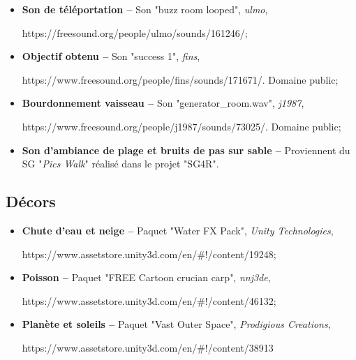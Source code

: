\begin{itemize}
		\item \textbf{Son de téléportation --} Son "buzz room looped", \textit{ulmo}, 
		
		https://freesound.org/people/ulmo/sounds/161246/;
		
		\item \textbf{Objectif obtenu --} Son "success 1", \textit{fins}, 
		
		https://www.freesound.org/people/fins/sounds/171671/. Domaine public;
		
		\item \textbf{Bourdonnement vaisseau --} Son "generator\_room.wav", \textit{j1987}, 
		
		https://www.freesound.org/people/j1987/sounds/73025/. Domaine public;
		
		\item \textbf{Son d'ambiance de plage et bruits de pas sur sable --} Proviennent du SG "\textit{Pics Walk}" réalisé dans le projet "SG4R".%
	\end{itemize}

\subsection*{Décors}
	\begin{itemize}
		\item \textbf{Chute d'eau et neige --} Paquet "Water FX Pack", \textit{Unity Technologies}, 
		
		https://www.assetstore.unity3d.com/en/\#!/content/19248;
		
		\item \textbf{Poisson --} Paquet "FREE Cartoon crucian carp", \textit{nnj3de}, 
		
		https://www.assetstore.unity3d.com/en/\#!/content/46132;
		
		\item \textbf{Planète et soleils --} Paquet "Vast Outer Space", \textit{Prodigious Creations}, 
		
		https://www.assetstore.unity3d.com/en/\#!/content/38913
	\end{itemize}
		

